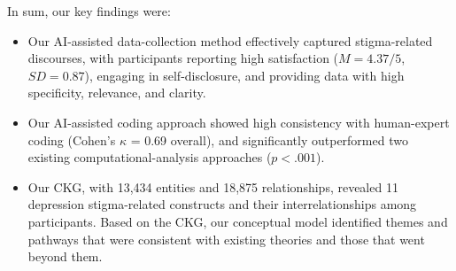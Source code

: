 In sum, our key findings were:
\begin{itemize}
    \item Our AI-assisted data-collection method effectively captured stigma-related discourses, with participants reporting high satisfaction ($M = 4.37/5$, $SD = 0.87$), engaging in self-disclosure, and providing data with high specificity, relevance, and clarity.
    \item Our AI-assisted coding approach showed high consistency with human-expert coding (Cohen's $\kappa$ = 0.69 overall), and significantly outperformed two existing computational-analysis approaches ($p < .001$).
    \item Our CKG, with 13,434 entities and 18,875 relationships, revealed 11 depression stigma-related constructs and their interrelationships among participants. Based on the CKG, our conceptual model identified themes and pathways that were consistent with existing theories and those that went beyond them.
\end{itemize}











